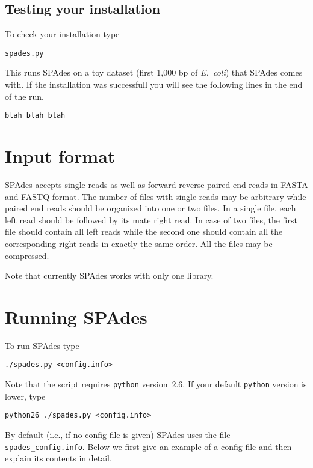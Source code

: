 \documentclass{article}
\def\spades{SPAdes}
\def\ecoli{\it E.~coli}
\begin{document}
\subsection{Testing your installation}
To check your installation type
\begin{lstlisting}
spades.py
\end{lstlisting}
This runs {\spades} on a toy dataset (first 1,000 bp of {\ecoli}) that {\spades} comes with. If the installation was successfull you will see the following lines in the end of the run.
\begin{lstlisting}
blah blah blah
\end{lstlisting}

\section{Input format}
{\spades} accepts single reads as well as forward-reverse paired end reads
in FASTA and FASTQ format. The number of files with single reads may be arbitrary while paired end reads should be organized into one or two files. In a single file, each left read should be followed by its mate right read. In case of two files, the first file should contain all left reads while the second one should contain all the corresponding right reads in exactly the same order. All the files may be compressed.

Note that currently {\spades} works with only one library.

\section{Running {\spades}}\label{sec:running}
To run {\spades} type
\begin{lstlisting}
./spades.py <config.info>
\end{lstlisting}
Note that the script requires {\tt python} version~2.6.
If your default {\tt python} version is lower, type
\begin{lstlisting}
python26 ./spades.py <config.info>
\end{lstlisting}
By default (i.e., if no config file is given) {\spades} uses the file {\tt spades\_config.info}. 
Below we first give an example of a config file
and then explain its contents in detail.
\end{document}
